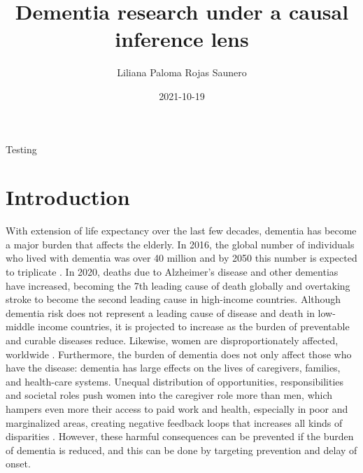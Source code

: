 \documentclass[
]{book}
\title{Dementia research under a causal inference lens}
\author{Liliana Paloma Rojas Saunero}
\date{2021-10-19}
\begin{document}
\maketitle

{
\setcounter{tocdepth}{1}
\tableofcontents
}
Testing

\hypertarget{intro}{%
\chapter{Introduction}\label{intro}}

With extension of life expectancy over the last few decades, dementia has become a major burden that affects the elderly. In 2016, the global number of individuals who lived with dementia was over 40 \autocite{gbd2016} million and by 2050 this number is expected to triplicate \autocite{worldreport2018}. In 2020, deaths due to Alzheimer's disease and other dementias have increased, becoming the 7th leading cause of death globally and overtaking stroke to become the second leading cause in high-income countries. Although dementia risk does not represent a leading cause of disease and death in low-middle income countries, it is projected to increase as the burden of preventable and curable diseases reduce\autocite{who2020}. Likewise, women are disproportionately affected, worldwide \autocite{women2015}. Furthermore, the burden of dementia does not only affect those who have the disease: dementia has large effects on the lives of caregivers, families, and health-care systems. Unequal distribution of opportunities, responsibilities and societal roles push women into the caregiver role more than men, which hampers even more their access to paid work and health, especially in poor and marginalized areas, creating negative feedback loops that increases all kinds of disparities \autocite{swinkels2019,brodaty2009,etters2008}. However, these harmful consequences can be prevented if the burden of dementia is reduced, and this can be done by targeting prevention and delay of onset\autocite{carrillo2013}.
\end{document}
